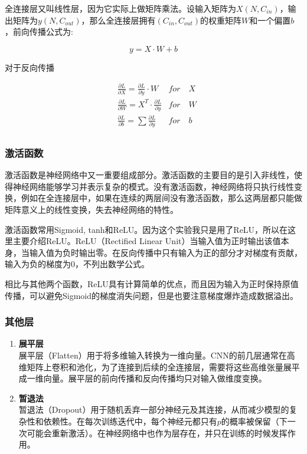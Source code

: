 全连接层又叫线性层，因为它实际上做矩阵乘法。设输入矩阵为$X(N, C_{in})$，输出矩阵为$y(N, C_{out})$，那么全连接层拥有$(C_{in}, C_{out})$的权重矩阵$W$和一个偏置$b$，前向传播公式为:

\[ 
y = X \cdot W + b
\]

对于反向传播

\begin{align*}
& \frac{\partial L}{\partial X} = \frac{\partial L}{\partial y} \cdot W & for \quad X\\
& \frac{\partial L}{\partial W} = X^T \cdot \frac{\partial L}{\partial y} & for \quad W \\
& \frac{\partial L}{\partial b} = \sum\frac{\partial L}{\partial y} & for \quad b \\
\end{align*}

\subsubsection{激活函数}

激活函数是神经网络中又一重要组成部分。激活函数的主要目的是引入非线性，使得神经网络能够学习并表示复杂的模式。没有激活函数，神经网络将只执行线性变换，例如在全连接层中，如果在连续的两层间没有激活函数，那么这两层都只能做矩阵意义上的线性变换，失去神经网络的特性。

激活函数常用Sigmoid, tanh和ReLU。因为这个实验我只是用了ReLU，所以在这里主要介绍ReLU。ReLU（Rectified Linear Unit）\cite{agarap2018deep}当输入值为正时输出该值本身，当输入值为负时输出零。在反向传播中只有输入为正的部分才对梯度有贡献，输入为负的梯度为0，不列出数学公式。

相比与其他两个函数，ReLU具有计算简单的优点，而且因为输入为正时保持原值传播，可以避免Sigmoid的梯度消失问题，但是也要注意梯度爆炸造成数据溢出。

\subsubsection{其他层}

\begin{enumerate}
    \item \textbf{展平层} \\
展平层（Flatten）用于将多维输入转换为一维向量。CNN的前几层通常在高维矩阵上卷积和池化，为了连接到后续的全连接层，需要将这些高维张量展平成一维向量。展平层的前向传播和反向传播均只对输入做维度变换。
    \item \textbf{暂退法} \\
暂退法（Dropout）\cite{hinton2012improving}用于随机丢弃一部分神经元及其连接，从而减少模型的复杂性和依赖性。在每次训练迭代中，每个神经元都只有$p$的概率被保留（下一次可能会重新激活）。在神经网络中也作为层存在，并只在训练的时候发挥作用。
\end{enumerate}

